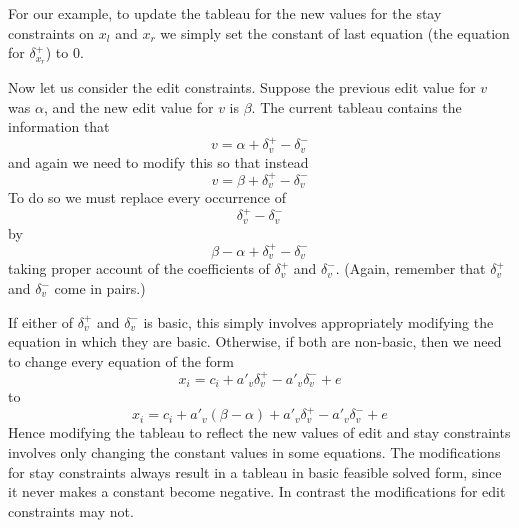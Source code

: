 \documentclass{article}
\begin{document}
For our example, to update the tableau for the new values for the stay
constraints on $x_l$ and $x_r$ we simply set the constant of last equation
(the equation for $\delta_{x_r}^+$) to 0.

Now let us consider the edit constraints.  Suppose the previous edit value
for $v$ was $\alpha$, and the new edit value for $v$ is $\beta$.  The
current tableau contains the information that 
$$v = \alpha + \delta_v^+ - \delta_v^-$$
and again we need to modify this so that instead 
$$v = \beta + \delta_v^+ - \delta_v^-$$
To do so we must replace every occurrence of 
$$\delta_v^+ - \delta_v^-$$
by 
$$\beta - \alpha + \delta_v^+ - \delta_v^-$$
taking proper account of the coefficients of $\delta_v^+$ and $\delta_v^-$.
(Again, remember that $\delta_v^+$ and $\delta_v^-$ come in pairs.)

If either of $\delta_v^+$ and $\delta_v^-$ is basic, this simply involves
appropriately modifying the equation in which they are basic.  Otherwise, if
both are non-basic, then we need to change every equation of the form
$$
x_i = c_i + a'_v \delta_v^+ - a'_v \delta_v^- + e
$$
to
$$
x_i = c_i + a'_v (\beta - \alpha) + a'_v \delta_v^+ - a'_v \delta_v^- + e
$$
Hence modifying the tableau to reflect the new values of edit and stay
constraints involves only changing the constant values in some equations.
The modifications for stay constraints always result in a tableau in basic
feasible solved form, since it never makes a constant become negative.
In contrast the modifications for edit constraints may not.
\end{document}
